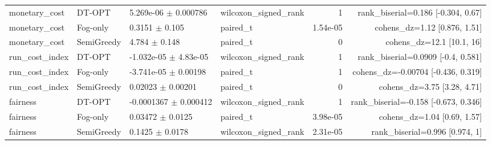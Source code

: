 \begin{table}[t]
\begin{tabular}{llllrr}
monetary\_cost & DT-OPT & 5.269e-06 $\pm$ 0.000786 & wilcoxon\_signed\_rank & 1 & rank\_biserial=0.186 [-0.304, 0.67] \\
monetary\_cost & Fog-only & 0.3151 $\pm$ 0.105 & paired\_t & 1.54e-05 & cohens\_dz=1.12 [0.876, 1.51] \\
monetary\_cost & SemiGreedy & 4.784 $\pm$ 0.148 & paired\_t & 0 & cohens\_dz=12.1 [10.1, 16] \\
run\_cost\_index & DT-OPT & -1.032e-05 $\pm$ 4.83e-05 & wilcoxon\_signed\_rank & 1 & rank\_biserial=0.0909 [-0.4, 0.581] \\
run\_cost\_index & Fog-only & -3.741e-05 $\pm$ 0.00198 & paired\_t & 1 & cohens\_dz=-0.00704 [-0.436, 0.319] \\
run\_cost\_index & SemiGreedy & 0.02023 $\pm$ 0.00201 & paired\_t & 0 & cohens\_dz=3.75 [3.28, 4.71] \\
fairness & DT-OPT & -0.0001367 $\pm$ 0.000412 & wilcoxon\_signed\_rank & 1 & rank\_biserial=-0.158 [-0.673, 0.346] \\
fairness & Fog-only & 0.03472 $\pm$ 0.0125 & paired\_t & 3.98e-05 & cohens\_dz=1.04 [0.69, 1.57] \\
fairness & SemiGreedy & 0.1425 $\pm$ 0.0178 & wilcoxon\_signed\_rank & 2.31e-05 & rank\_biserial=0.996 [0.974, 1] \\
\bottomrule
\end{tabular}
\end{table}

